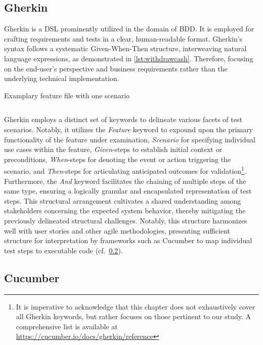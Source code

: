 \subsection{Gherkin}
\label{subsec:gherkin}

Gherkin is a \ac{DSL} prominently utilized in the domain of \ac{BDD}. It is employed for crafting requirements and tests in a clear, human-readable format. Gherkin's syntax follows a systematic Given-When-Then structure, interweaving natural language expressions, as demonstrated in \cref{lst:withdrawcash}. Therefore, focusing on the end-user's perspective and business requirements rather than the underlying technical implementation.

\begin{listing}[!ht]
\caption{Examplary feature file with one scenario}
\label{lst:withdrawcash}
\inputminted{gherkin}{files/code/atm.feature}
\end{listing}

 Gherkin employs a distinct set of keywords to delineate various facets of test scenarios. Notably, it utilizes the \textit{Feature} keyword to expound upon the primary functionality of the feature under examination, \textit{Scenario} for specifying individual use cases within the feature, \textit{Given}-steps to establish initial context or preconditions, \textit{When}-steps for denoting the event or action triggering the scenario, and \textit{Then}-steps for articulating anticipated outcomes for validation\footnote{It is imperative to acknowledge that this chapter does not exhaustively cover all Gherkin keywords, but rather focuses on those pertinent to our study. A comprehensive list is available at \href{https://cucumber.io/docs/gherkin/reference/\#keywords}{https://cucumber.io/docs/gherkin/reference}}. Furthermore, the \textit{And} keyword facilitates the chaining of multiple steps of the same type, ensuring a logically granular and encapsulated representation of test steps. This structural arrangement cultivates a shared understanding among stakeholders concerning the expected system behavior, thereby mitigating the previously delineated structural challenges. Notably, this structure harmonizes well with user stories and other agile methodologies, presenting sufficient structure for interpretation by frameworks such as Cucumber to map individual test steps to executable code (cf.~\cref{subsec:cucumber}).


\subsection{Cucumber}
\label{subsec:cucumber}

